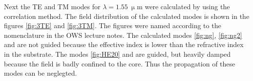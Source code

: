 Next the TE and TM modes for $\lambda = 1.55~\upmu$m were calculated by using the correlation method. The field distribution of the calculated modes is shown in the figures \ref{fig:3TE} and \ref{fig:3TM}. The figures were named according to the nomenclature in the OWS lecture notes. The calculated modes \ref{fig:ng}, \ref{fig:ng2} and  are not guided because the effective index is lower than the refractive index in the substrate. The modes \ref{fig:HE20} and  are guided, but heavily damped because the field is badly confined to the core. Thus the propagation of these modes can be neglegted.

\begin{figure}%
\centering

\end{figure}
